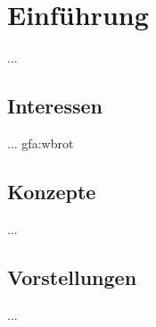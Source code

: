 %
%


\chapter{Einführung}
\label{Einführung}

...
\\





\section{Interessen}

... \gls{gfa:wbrot}
\\



\section{Konzepte}

...
\\



\section{Vorstellungen}

...
\\











